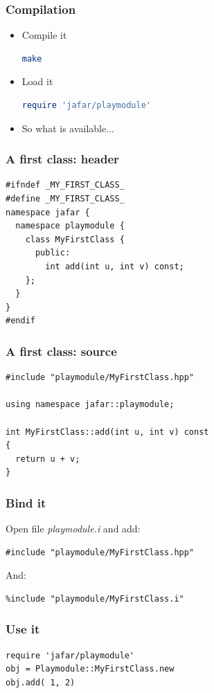 \documentclass[compress]{beamer}
\begin{document}
\begin{frame}[fragile]
  \frametitle{Compilation}
  \begin{itemize}
    \item<1-> Compile it
      \begin{lstlisting}[language=bash]
make
      \end{lstlisting}
    \item<2-> Load it
      \begin{lstlisting}[language=ruby]
require 'jafar/playmodule'
      \end{lstlisting}
    \item<3-> So what is available...
  \end{itemize}
\end{frame}

\begin{frame}[fragile]
  \frametitle{A first class: header}
  \begin{lstlisting}
#ifndef _MY_FIRST_CLASS_
#define _MY_FIRST_CLASS_
namespace jafar {
  namespace playmodule {
    class MyFirstClass {
      public:
        int add(int u, int v) const;
    };
  }
}
#endif
  \end{lstlisting}
\end{frame}

\begin{frame}[fragile]
  \frametitle{A first class: source}
  \begin{lstlisting}
#include "playmodule/MyFirstClass.hpp"

using namespace jafar::playmodule;

int MyFirstClass::add(int u, int v) const
{
  return u + v;
}
  \end{lstlisting}
\end{frame}

\begin{frame}[fragile]
  \frametitle{Bind it}
  Open file \textit{playmodule.i} and add:
  \begin{lstlisting}
#include "playmodule/MyFirstClass.hpp"
  \end{lstlisting}
  And:
  \begin{lstlisting}
%include "playmodule/MyFirstClass.i"
  \end{lstlisting}
\end{frame}

\begin{frame}[fragile]
  \frametitle{Use it}
  \begin{lstlisting}
require 'jafar/playmodule'
obj = Playmodule::MyFirstClass.new
obj.add( 1, 2)
  \end{lstlisting}
\end{frame}
\end{document}
